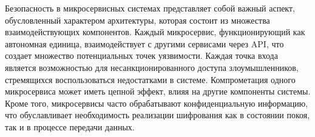 

Безопасность в микросервисных системах представляет собой важный аспект, обусловленный характером архитектуры, которая состоит из множества взаимодействующих компонентов. Каждый микросервис, функционирующий как автономная единица, взаимодействует с другими сервисами через API, что создает множество потенциальных точек уязвимости. 
Каждая точка входа является возможностью для несанкционированного доступа злоумышленников, стремящихся воспользоваться недостатками в системе. Компрометация одного микросервиса может иметь цепной эффект, влияя на другие компоненты системы.
Кроме того, микросервисы часто обрабатывают конфиденциальную информацию, что обуславливает необходимость реализации шифрования как в состоянии покоя, так и в процессе передачи данных.~\cite{m_security}




